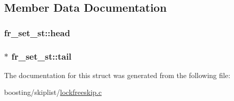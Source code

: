 \subsection{Member Data Documentation}
\hypertarget{structfr__set__st_ac8c59d28a8eb6d018995637133eb488a}{
\subsubsection[{head}]{ fr\-\_\-set\-\_\-st\-::head}}\label{structfr__set__st_ac8c59d28a8eb6d018995637133eb488a}
\hypertarget{structfr__set__st_a92e53d1e8353bd352d10d1ce48727218}{
\subsubsection[{tail}]{$\ast$ fr\-\_\-set\-\_\-st\-::tail}}\label{structfr__set__st_a92e53d1e8353bd352d10d1ce48727218}


The documentation for this struct was generated from the following file\-:\begin{DoxyCompactItemize}
\item 
boosting/skiplist/\hyperlink{lockfreeskip_8c}{lockfreeskip.\-c}\end{DoxyCompactItemize}
